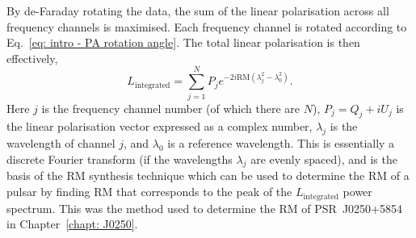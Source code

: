 
By de-Faraday rotating the data, the sum of the linear polarisation across all frequency channels is maximised. Each frequency channel is rotated according to Eq.~\eqref{eq: intro - PA rotation angle}. The total linear polarisation is then effectively, 
\begin{equation}
    \label{eq: intro - defaraday rotation}
    L_\mathrm{integrated} = \sum_{j=1}^N P_j e^{-2i \mathrm{RM} (\lambda^2_j - \lambda^2_0)}.
\end{equation}
Here $j$ is the frequency channel number (of which there are $N$), $P_j = Q_j + iU_j$ is the linear polarisation vector expressed as a complex number, $\lambda_j$ is the wavelength of channel $j$, and $\lambda_0$ is a reference wavelength. This is essentially a discrete Fourier transform (if the wavelengths $\lambda_j$ are evenly spaced), and is the basis of the RM synthesis technique \citep{Bxxx1966, BBxx2005, Hxxx2008} which can be used to determine the RM of a pulsar by finding RM that corresponds to the peak of the $L_\mathrm{integrated}$ power spectrum. This was the method used to determine the RM of PSR~J0250+5854 in Chapter~\ref{chapt: J0250}.
















